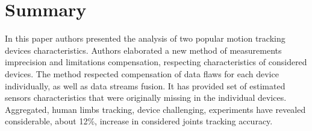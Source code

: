\documentclass{llncs}
\begin{document}
\section{Summary}
In this paper authors presented the analysis of two popular motion tracking devices characteristics. Authors elaborated a new method of measurements imprecision and limitations compensation, respecting characteristics of considered devices. The method respected compensation of data flaws for each device individually, as well as data streams fusion. It has provided set of estimated sensors characteristics that were originally missing in the individual devices. Aggregated, human limbs tracking, device challenging, experiments have revealed considerable, about 12\%, increase in considered joints tracking accuracy.
\end{document}
